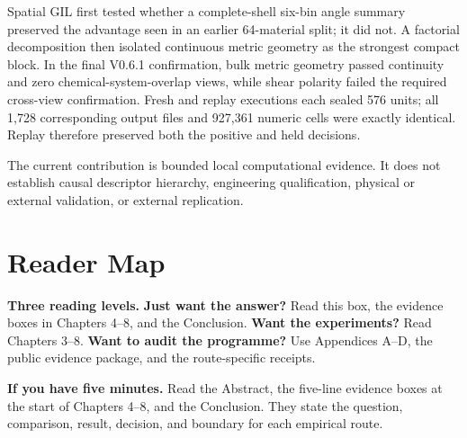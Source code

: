 \documentclass[11pt,a4paper,oneside]{report}
\begin{document}
Spatial GIL first tested whether a complete-shell six-bin angle summary preserved
the advantage seen in an earlier 64-material split; it did not. A factorial
decomposition then isolated continuous metric geometry as the strongest compact
block. In the final V0.6.1 confirmation, bulk metric geometry passed continuity and
zero chemical-system-overlap views, while shear polarity failed the required
cross-view confirmation. Fresh and replay executions each sealed 576 units; all
1,728 corresponding output files and 927,361 numeric cells were exactly identical.
Replay therefore preserved both the positive and held decisions.

The current contribution is bounded local computational evidence. It does not
establish causal descriptor hierarchy, engineering qualification, physical or
external validation, or external replication.

\clearpage

\chapter*{Reader Map}
\begin{center}
\end{center}

\textbf{Three reading levels.} \textbf{Just want the answer?} Read this box, the evidence boxes in Chapters 4--8, and the Conclusion. \textbf{Want the experiments?} Read Chapters 3--8. \textbf{Want to audit the programme?} Use Appendices A--D, the public evidence package, and the route-specific receipts.

\textbf{If you have five minutes.} Read the Abstract, the five-line evidence boxes at the start of Chapters 4--8, and the Conclusion. They state the question, comparison, result, decision, and boundary for each empirical route.
\end{document}
